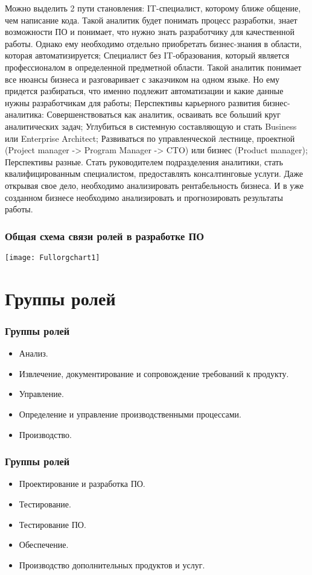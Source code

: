 \documentclass{../industrial-development}
\begin{document}
\lecturenotes 
Можно выделить 2 пути становления: 
IT-специалист, которому ближе общение, чем написание кода. Такой аналитик будет понимать процесс разработки, знает возможности ПО и понимает, что нужно знать разработчику для качественной работы. Однако ему необходимо отдельно приобретать бизнес-знания в области, которая автоматизируется;
Специалист без IT-образования, который является профессионалом в определенной предметной области. Такой аналитик понимает все нюансы бизнеса и разговаривает с заказчиком на одном языке. Но ему придется разбираться, что именно подлежит автоматизации и какие данные нужны разработчикам для работы;
Перспективы карьерного развития бизнес-аналитика: 
Совершенствоваться как аналитик, осваивать все больший круг аналитических задач;
Углубиться в системную составляющую и стать Business или Enterprise Architect; 
Развиваться по управленческой лестнице, проектной (Project manager -> Program Manager -> CTO) или бизнес (Product manager); 
Перспективы разные. Стать руководителем подразделения аналитики, стать квалифицированным специалистом, предоставлять консалтинговые услуги. Даже открывая свое дело, необходимо анализировать рентабельность бизнеса. И в уже созданном бизнесе необходимо анализировать и прогнозировать результаты работы.~\cite{Business}

\begin{frame} \frametitle{Общая схема связи ролей в разработке ПО}
 \texttt{[image: Fullorgchart1]}

\end{frame}


\section{Группы ролей}

\begin{frame} \frametitle{Группы ролей}
  \begin{itemize}
    \item Анализ. 
    \item Извлечение, документирование и сопровождение требований к продукту.
    \item Управление. 
    \item Определение и управление производственными процессами.
    \item Производство.
  \end{itemize}
\end{frame}

\begin{frame} \frametitle{Группы ролей}
	\begin{itemize}
    \item Проектирование и разработка ПО.
	\item Тестирование. 
	\item Тестирование ПО.
	\item Обеспечение. 
	\item Производство дополнительных продуктов и услуг.
	\end{itemize}
\end{frame}
\end{document}
